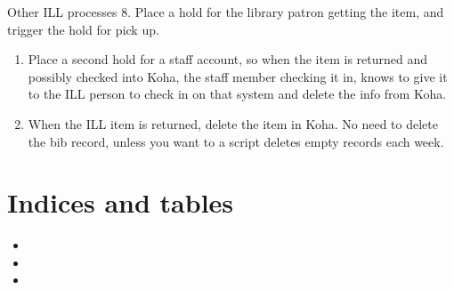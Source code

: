 \documentclass[letterpaper,10pt,english]{sphinxmanual}
\begin{document}
Other ILL processes 8. Place a hold for the library patron getting the
item, and trigger the hold for pick up.
\begin{enumerate}
\item {} 
Place a second hold for a staff account, so when the item is returned
and possibly checked into Koha, the staff member checking it in,
knows to give it to the ILL person to check in on that system and
delete the info from Koha.

\item {} 
When the ILL item is returned, delete the item in Koha. No need to
delete the bib record, unless you want to \textendash{} a script deletes empty
records each week.

\end{enumerate}


\chapter{Indices and tables}
\label{\detokenize{index:indices-and-tables}}\begin{itemize}
\item {} 

\item {} 

\item {} 

\end{itemize}



\renewcommand{\indexname}{Index}
\printindex
\end{document}
